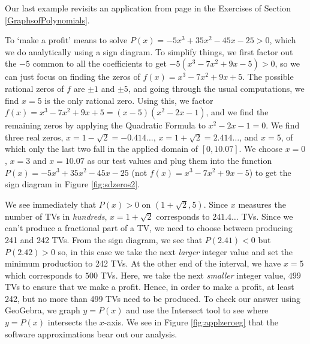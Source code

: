 \medskip

Our last example revisits an application from page \pageref{LCDmaxprofit} in the Exercises of Section \ref{GraphsofPolynomials}.

\medskip

{To `make a profit' means to solve $P(x) = -5x^3+35x^2-45x-25 > 0$, which we do analytically using a sign diagram.  To simplify things, we first factor out the $-5$ common to all the coefficients to get $-5\left(x^3 - 7x^2+9x-5\right) > 0$, so we can just focus on finding the zeros of $f(x) = x^3-7x^2+9x+5$.  The possible rational zeros of $f$ are $\pm 1$ and $\pm 5$, and going through the usual computations, we find $x=5$ is the only rational zero.  Using this, we factor $f(x) = x^3-7x^2+9x+5 = (x-5) \left(x^2-2x-1\right)$, and we find the remaining zeros by applying the Quadratic Formula to $x^2-2x-1 = 0$.  We find three real zeros,  $x=1-\sqrt{2} = -0.414 \ldots$,  $x = 1+\sqrt{2} = 2.414 \ldots$, and $x = 5$, of which only the last two fall in the applied domain of $[0, 10.07]$.  We choose $x=0$, $x=3$ and $x=10.07$ as our test values and plug them into the function $P(x)=-5x^3+35x^2-45x-25$ (not $f(x) =x^3 - 7x^2+9x-5$) to get the sign diagram in Figure \ref{fig:sdzeros2}.

{}


We see immediately that $P(x)>0$ on $(1+\sqrt{2},5)$.  Since $x$ measures the number of TVs in \textit{hundreds}, $x = 1 + \sqrt{2}$ corresponds to $241.4\ldots$ TVs.  Since we can't produce a fractional part of a TV, we need to choose between producing 241 and 242 TVs.  From the sign diagram, we see that $P(2.41) < 0$ but $P(2.42)>0$ so, in this case we take the next \textit{larger} integer value and set the minimum production to 242 TVs.  At the other end of the interval, we have $x=5$ which corresponds to $500$ TVs.  Here, we take the next \textit{smaller} integer value, $499$ TVs to ensure that we make a profit.  Hence, in order to make a profit, at least 242, but no more than 499 TVs need to be produced.  To check our answer using GeoGebra, we graph $y=P(x)$ and use the Intersect tool to see where $y=P(x)$ intersects the $x$-axis. We see in Figure \ref{fig:applzeroeg} that the software approximations bear out our analysis.
}

